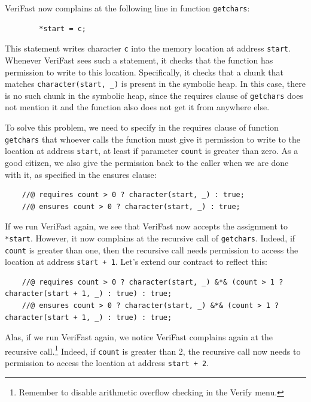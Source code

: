 \documentclass{article}
\begin{document}
VeriFast now complains at the following line in function \lstinline!getchars!:
\begin{lstlisting}
        *start = c;
\end{lstlisting}
This statement writes character \lstinline!c! into the memory location at address \lstinline!start!.
Whenever VeriFast sees such a statement, it checks that the function has permission to write to this location.
Specifically, it checks that a chunk that matches \lstinline!character(start, _)! is present in the symbolic heap.
In this case, there is no such chunk in the symbolic heap, since the requires clause of \lstinline!getchars! does not
mention it and the function also does not get it from anywhere else.

To solve this problem, we need to specify in the requires clause of function \lstinline!getchars! that whoever calls the function
must give it permission to write to the location at address \lstinline!start!, at least if parameter \lstinline!count! is greater than zero.
As a good citizen, we also give the permission back to the caller when we are done with it, as specified in the ensures clause:
\begin{lstlisting}
    //@ requires count > 0 ? character(start, _) : true;
    //@ ensures count > 0 ? character(start, _) : true;
\end{lstlisting}
If we run VeriFast again, we see that VeriFast now accepts the assignment to \lstinline!*start!. However, it now complains at the recursive call of
\lstinline!getchars!. Indeed, if \lstinline!count! is greater than one, then the recursive call needs permission to access the location at address
\lstinline!start + 1!. Let's extend our contract to reflect this:
\begin{lstlisting}
    //@ requires count > 0 ? character(start, _) &*& (count > 1 ? character(start + 1, _) : true) : true;
    //@ ensures count > 0 ? character(start, _) &*& (count > 1 ? character(start + 1, _) : true) : true;
\end{lstlisting}
Alas, if we run VeriFast again, we notice VeriFast complains again at the recursive call.\footnote{Remember to disable arithmetic overflow checking in the Verify menu.}
Indeed, if \lstinline!count! is greater than 2,
the recursive call now needs to permission to access the location at address \lstinline!start + 2!.
\end{document}
